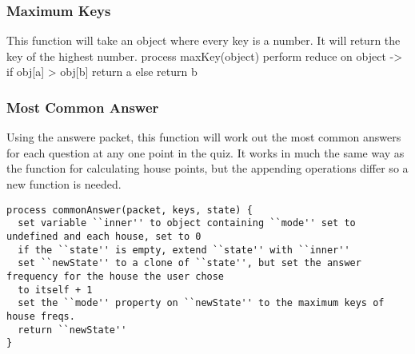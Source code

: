 \subsubsection{Maximum Keys}
This function will take an object where every key is a number. It will return the key of the highest number.
process maxKey(object) {
  perform reduce on object ->
  if obj[a] > obj[b] return a
  else return b
}

\subsubsection{Most Common Answer}
Using the answere packet, this function will work out the most common answers for each question at any one point in the quiz. It works in much the same way as the function for calculating house points, but the appending operations differ so a new function is needed.
\begin{verbatim}
process commonAnswer(packet, keys, state) {
  set variable ``inner'' to object containing ``mode'' set to undefined and each house, set to 0
  if the ``state'' is empty, extend ``state'' with ``inner''
  set ``newState'' to a clone of ``state'', but set the answer frequency for the house the user chose
  to itself + 1
  set the ``mode'' property on ``newState'' to the maximum keys of house freqs.
  return ``newState''
}
\end{verbatim}
